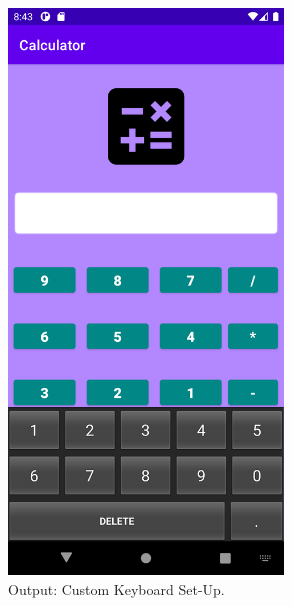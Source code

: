 \documentclass[12pt, a4]{article}
\begin{document}
\subsection*{}
\begin{figure}[h]
\centering
\caption{Output: Custom Keyboard Set-Up.}
\includegraphics[height=15cm, width=7.3cm]{Calculator/Screenshots/Calculator-4.png}
\end{figure}

\newpage
\end{document}
